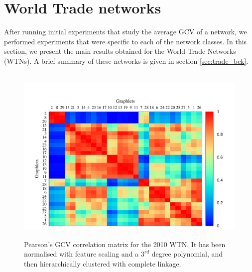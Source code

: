 


\section{World Trade networks}
\label{trade_res_heatmaps}

After running initial experiments that study the average GCV of a network, we performed experiments that were specific to each of the network classes. In this section, we present the main results obtained for the World Trade Networks (WTNs). A brief summary of these networks is given in section \ref{sec:trade_bck}. 

\begin{figure}[H]
  \begin{center}
  \hbox{\hspace{-1cm}
  \includegraphics[scale=1.0]{../code/final_results/trade_2010_thresholded/heatmap_pearsons_hclust_trade_2010_thresholded-poly-32.pdf}} 
  \caption[Pearson's GCV correlation matrix for the 2010 WTN]{Pearson's GCV correlation matrix for the 2010 WTN. It has been normalised with feature scaling and a $3^{rd}$ degree polynomial, and then hierarchically clustered with complete linkage.}
  \label{fig:trade_heatmap}
  \end{center}
\end{figure}


